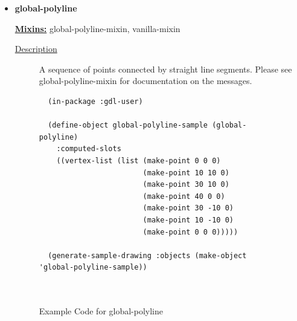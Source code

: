 \documentclass [11pt]{book}
\begin{document}
\begin{itemize}
\begin{description}
\end{description}







\item {}
\label{prim:global-polyline}
\textbf{global-polyline}


\textbf{
\underline{Mixins:}} global-polyline-mixin, vanilla-mixin





\begin{description}

\item [
\underline{Description}]


A sequence of points connected by straight line segments. Please see
global-polyline-mixin for documentation on the messages.



\end{description}




\begin{figure}
\begin{lrbox}{\boxedverb}
\begin{minipage}{\linewidth}
{\small

\begin{verbatim}
  (in-package :gdl-user)

  (define-object global-polyline-sample (global-polyline)
    :computed-slots
    ((vertex-list (list (make-point 0 0 0)
                        (make-point 10 10 0)
                        (make-point 30 10 0)
                        (make-point 40 0 0)
                        (make-point 30 -10 0)
                        (make-point 10 -10 0)
                        (make-point 0 0 0)))))
  
  (generate-sample-drawing :objects (make-object 'global-polyline-sample))

  
\end{verbatim}}
\end{minipage}
\end{lrbox}
\fbox{\usebox{\boxedverb}}

\caption{Example Code for global-polyline}

\label{fig:example-code-global-polyline}

\end{figure}


\end{itemize}
\end{document}
